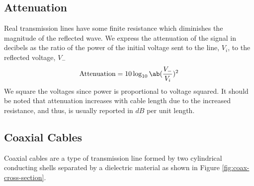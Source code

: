 \documentclass[
	a4paper, %
	10pt, %
	twoside, %
]{journal}
\begin{document}
\subsection{Attenuation}
Real transmission lines have some finite resistance which diminishes the magnitude of the reflected wave. We express the attenuation of the signal in decibels as the ratio of the power of the initial voltage sent to the line, $V_i$, to the reflected voltage, $V_-$
\begin{equation}
    \label{eqn:attenuation-formula}
    \textrm{Attenuation} = 10\log_{10} \ab(\frac{V_-}{V_i})^2
\end{equation} 
We square the voltages since power is proportional to voltage squared. It should be noted that attenuation increases with cable length due to the increased resistance, and thus, is usually reported in $\unit{dB}$ per unit length. 

\subsection{Coaxial Cables}
Coaxial cables are a type of transmission line formed by two cylindrical conducting shells separated by a dielectric material as shown in Figure \ref{fig:coax-cross-section}. 
\end{document}
